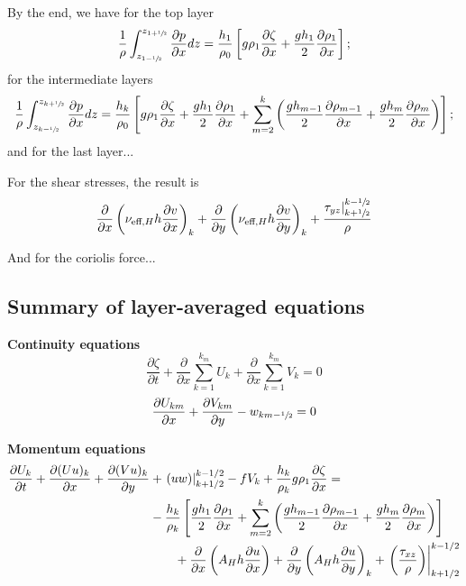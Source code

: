 By the end, we have for the top layer
\begin{equation}
    \frac{1}{\rho}  \int_{z_{1-\sfrac{1}{2}}}^{z_{1+\sfrac{1}{2}}} \frac{\partial p}{\partial x}dz =  \frac{h_1}{\rho_0}\left[g \rho_1 \frac{\partial \zeta}{\partial x}+\frac{g h_1}{2} \frac{\partial \rho_1}{\partial x}\right];
\end{equation}
for the intermediate layers
\begin{equation}
    \frac{1}{\rho}  \int_{z_{k-\sfrac{1}{2}}}^{z_{k+\sfrac{1}{2}}} \frac{\partial p}{\partial x}dz = \frac{h_k}{\rho_0}\left[g \rho_1 \frac{\partial \zeta}{\partial x}+\frac{g h_1}{2} \frac{\partial \rho_1}{\partial x}+\sum_{m=2}^k\left(\frac{g h_{m-1}}{2} \frac{\partial \rho_{m-1}}{\partial x}+\frac{g h_m}{2} \frac{\partial \rho_m}{\partial x}\right)\right];
\end{equation}
and for the last layer...

For the shear stresses, the result is 
\begin{equation}
    \frac{\partial}{\partial x}\left( \nu_{\text{eff},H} h \frac{\partial v}{\partial x}\right)_k + \frac{\partial}{\partial y}\left( \nu_{\text{eff},H} h \frac{\partial v}{\partial y}\right)_k + \frac{\tau_{yz}|^{k-\sfrac{1}{2}}_{k+\sfrac{1}{2}}}{\rho}
\end{equation}

And for the coriolis force...

\subsection{Summary of layer-averaged equations}
\textbf{Continuity equations}
\begin{equation}
    \frac{\partial \zeta}{\partial t}+\frac{\partial }{\partial x}\sum_{k=1}^{k_m}U_k +\frac{\partial }{\partial x}\sum_{k=1}^{k_m}V_k  = 0
    \label{eq:LICONT1}
\end{equation}
\begin{equation}
    \frac{\partial U_{km}}{\partial x} +  \frac{\partial V_{km}}{\partial y} -  w_{km-\sfrac{1}{2}}  = 0
    \label{eq:LICONT2}
\end{equation}

\textbf{Momentum equations}
\begin{align}
 \frac{\partial U_k}{\partial t}+\frac{\partial(U u)_k}{\partial x}+\frac{\partial(V u)_k}{\partial y}&+\left.(u w)\right|_{k+1 / 2} ^{k-1 / 2}-f V_k+\frac{h_k}{\rho_k} g \rho_1 \frac{\partial \zeta}{\partial x}=  \notag\\
&- \frac{h_k}{\rho_k}\left[\frac{g h_1}{2} \frac{\partial \rho_1}{\partial x}+\sum_{m=2}^k\left(\frac{g h_{m-1}}{2} \frac{\partial \rho_{m-1}}{\partial x}+\frac{g h_m}{2} \frac{\partial \rho_m}{\partial x}\right)\right] \notag\\
&\qquad+\frac{\partial}{\partial x}\left(A_H h \frac{\partial u}{\partial x}\right)+\frac{\partial}{\partial y}\left(A_H h \frac{\partial u}{\partial y}\right)_k+\left.\left(\frac{\tau_{x z}}{\rho}\right)\right|_{k+1 / 2} ^{k-1 / 2} 
\end{align}

